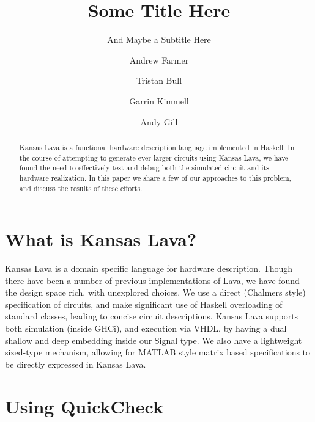 \documentclass{llncs}
\begin{document}
\title{Some Title Here}
\subtitle{And Maybe a Subtitle Here}

\author{Andrew Farmer \and Tristan Bull \and Garrin Kimmell \and Andy Gill}


\maketitle

\begin{abstract}
Kansas Lava is a functional hardware description language implemented
in Haskell. In the course of attempting to generate ever larger circuits
using Kansas Lava, we have found the need to effectively test and debug
both the simulated circuit and its hardware realization. In this paper
we share a few of our approaches to this problem, and discuss the
results of these efforts.
\end{abstract}

\section{What is Kansas Lava?}

Kansas Lava is a domain specific language for hardware description.
Though there have been a number of previous implementations
of Lava, we have found the design space rich, with unexplored choices.
We use a direct (Chalmers style) specification of circuits, and make 
significant use of Haskell overloading of standard classes, leading to
concise circuit descriptions. Kansas Lava supports both simulation (inside
GHCi), and execution via VHDL, by having a dual shallow and deep
embedding inside our Signal type. We also have a lightweight sized-type
mechanism, allowing for MATLAB style matrix based specifications to
be directly expressed in Kansas Lava.

\section{Using QuickCheck}
\end{document}
